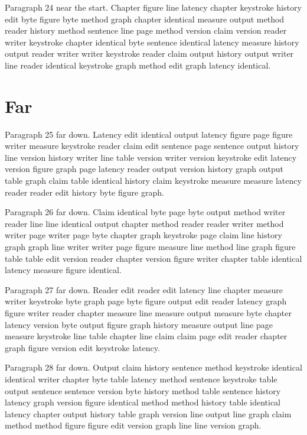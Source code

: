 \documentclass{article}
\begin{document}
Paragraph 24 near the start. Chapter figure line latency chapter keystroke history edit byte figure byte method graph chapter identical measure output method reader history method sentence line page method version claim version reader writer keystroke chapter identical byte sentence identical latency measure history output reader writer writer keystroke reader claim output history output writer line reader identical keystroke graph method edit graph latency identical.



\section{Far}

Paragraph 25 far down. Latency edit identical output latency figure page figure writer measure keystroke reader claim edit sentence page sentence output history line version history writer line table version writer version keystroke edit latency version figure graph page latency reader output version history graph output table graph claim table identical history claim keystroke measure measure latency reader reader edit history byte figure graph.

Paragraph 26 far down. Claim identical byte page byte output method writer reader line line identical output chapter method reader reader writer method writer page writer page byte chapter graph keystroke page claim line history graph graph line writer writer page figure measure line method line graph figure table table edit version reader chapter version figure writer chapter table identical latency measure figure identical.

Paragraph 27 far down. Reader edit reader edit latency line chapter measure writer keystroke byte graph page byte figure output edit reader latency graph figure writer reader chapter measure line measure output measure byte chapter latency version byte output figure graph history measure output line page measure keystroke line table chapter line claim claim page edit reader chapter graph figure version edit keystroke latency.

Paragraph 28 far down. Output claim history sentence method keystroke identical identical writer chapter byte table latency method sentence keystroke table output sentence sentence version byte history method table sentence history latency graph version figure identical method method history table identical latency chapter output history table graph version line output line graph claim method method figure figure edit version graph line line version graph.
\end{document}
